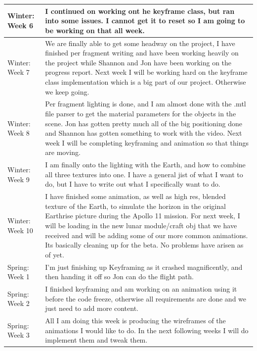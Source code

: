 \documentclass[onecolumn, draftclsnofoot,10pt, compsoc]{IEEEtran}
\begin{document}
\begin{longtable} {|p{1.5cm}|p{13.5cm}|}
Winter: Week 6 &
I continued on working ont he keyframe class, but ran into some issues. I cannot get it to reset so I am going to be working on that all week. \\ \hline

Winter: Week 7 &
We are finally able to get some headway on the project, I have finished per fragment writing and have been working heavily on the project while Shannon and Jon have been working on the progress report. Next week I will be working hard on the keyframe class implementation which is a big part of our project. Otherwise we keep going. \\ \hline

Winter: Week 8 &
Per fragment lighting is done, and I am almost done with the .mtl file parser to get the material parameters for the objects in the scene. Jon has gotten pretty much all of the big positioning done and Shannon has gotten something to work with the video. Next week I will be completing keyframing and animation so that things are moving. \\ \hline

Winter: Week 9 &
I am finally onto the lighting with the Earth, and how to combine all three textures into one. I have a general jist of what I want to do, but I have to write out what I specifically want to do.  \\ \hline

Winter: Week 10 &
I have finished some animation, as well as high res, blended texture of the Earth, to simulate the horizon in the original Earthrise picture during the Apollo 11 mission. For next week, I will be loading in the new lunar module/craft obj that we have received and will be adding some of our more common animations. Its basically cleaning up for the beta. No problems have arisen as of yet. \\ \hline

Spring: Week 1 &
I’m just finishing up Keyframing as it crashed magnificently, and then handing it off so Jon can do the flight path.  \\ \hline

Spring: Week 2 &
I finished keyframing and am working on an animation using it before the code freeze, otherwise all requirements are done and we just need to add more content. \\ \hline

Spring: Week 3 &
All I am doing this week is producing the wireframes of the animations I would like to do.  In the next following weeks I will do implement them and tweak them.  \\ \hline


\end{longtable}
\end{document}
